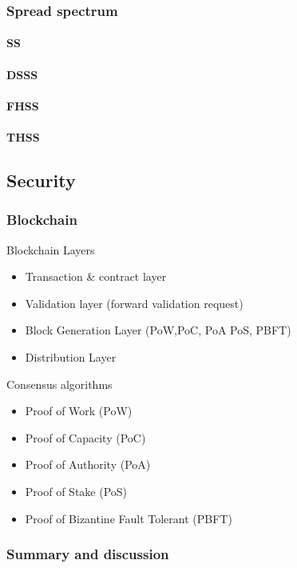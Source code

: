 \subsubsection{Spread spectrum}

\paragraph{SS}
\paragraph{DSSS} 
\paragraph{FHSS} 
\paragraph{THSS}


\subsection{Security}

\subsubsection{Blockchain}

Blockchain Layers
\begin{itemize}
	\item Transaction \& contract layer
	\item Validation layer (forward validation request)
	\item Block Generation Layer (PoW,PoC, PoA PoS, PBFT)
	\item Distribution Layer
	\\
\end{itemize}

Consensus algorithms
\begin{itemize}
	\item Proof of Work (PoW)
	\item Proof of Capacity (PoC)
	\item Proof of Authority (PoA)
	\item Proof of Stake (PoS)
	\item Proof of Bizantine Fault Tolerant (PBFT)
\end{itemize}


\subsubsection{Summary and discussion}











